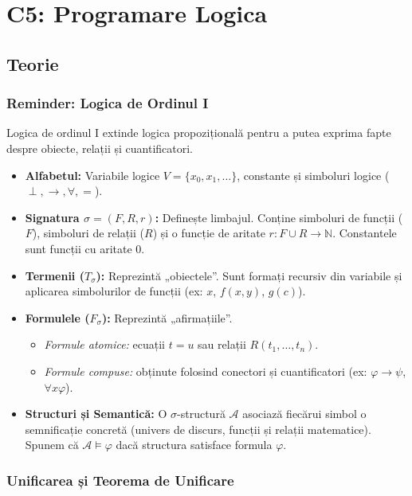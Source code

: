\section*{C5: Programare Logica}
\subsection{Teorie}
\subsubsection{Reminder: Logica de Ordinul I}

Logica de ordinul I extinde logica propozițională pentru a putea exprima fapte despre obiecte, relații și cuantificatori.

\begin{itemize}
	\item \textbf{Alfabetul:} Variabile logice $V = \{x_0, x_1, \dots\}$, constante și simboluri logice ($\perp, \rightarrow, \forall, =$).
	\item \textbf{Signatura $\sigma = (F, R, r)$:} Definește limbajul. Conține simboluri de funcții ($F$), simboluri de relații ($R$) și o funcție de aritate $r : F \cup R \to \mathbb{N}$. Constantele sunt funcții cu aritate 0.
	\item \textbf{Termenii ($T_\sigma$):} Reprezintă „obiectele”. Sunt formați recursiv din variabile și aplicarea simbolurilor de funcții (ex: $x$, $f(x, y)$, $g(c)$).
	\item \textbf{Formulele ($F_\sigma$):} Reprezintă „afirmațiile”.
	      \begin{itemize}
		      \item \textit{Formule atomice:} ecuații $t = u$ sau relații $R(t_1, \dots, t_n)$.
		      \item \textit{Formule compuse:} obținute folosind conectori și cuantificatori (ex: $\varphi \rightarrow \psi$, $\forall x \varphi$).
	      \end{itemize}
	\item \textbf{Structuri și Semantică:} O $\sigma$-structură $\mathcal{A}$ asociază fiecărui simbol o semnificație concretă (univers de discurs, funcții și relații matematice). Spunem că $\mathcal{A} \models \varphi$ dacă structura satisface formula $\varphi$.
\end{itemize}

\subsubsection{Unificarea și Teorema de Unificare}

